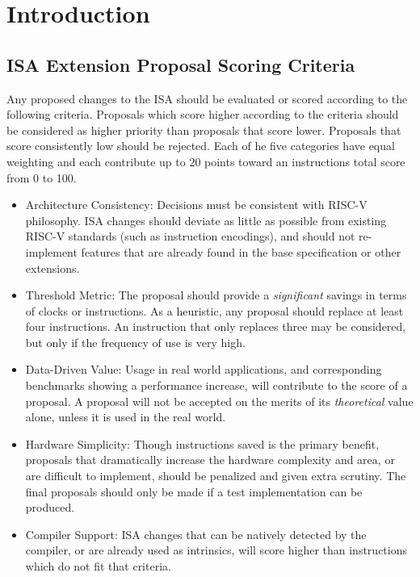\chapter{Introduction}

\section{ISA Extension Proposal Scoring Criteria}

Any proposed changes to the ISA should be evaluated or scored according
to the following criteria. Proposals which score higher according to the
criteria should be considered as higher priority than proposals that
score lower. Proposals that score consistently low should be rejected.
Each of he five categories have equal weighting and each contribute up
to 20 points toward an instructions total score from 0 to 100.

\begin{itemize}
\item
  Architecture Consistency: Decisions must be consistent with RISC-V
  philosophy. ISA changes should deviate as little as possible from
  existing RISC-V standards (such as instruction encodings), and should
  not re-implement features that are already found in the base
  specification or other extensions.
\item
  Threshold Metric: The proposal should provide a \emph{significant}
  savings in terms of clocks or instructions. As a heuristic, any
  proposal should replace at least four instructions. An instruction
  that only replaces three may be considered, but only if the frequency
  of use is very high.
\item
  Data-Driven Value: Usage in real world applications, and corresponding
  benchmarks showing a performance increase, will contribute to the
  score of a proposal. A proposal will not be accepted on the merits of
  its \emph{theoretical} value alone, unless it is used in the real
  world.
\item
  Hardware Simplicity: Though instructions saved is the primary benefit,
  proposals that dramatically increase the hardware complexity and area,
  or are difficult to implement, should be penalized and given extra
  scrutiny. The final proposals should only be made if a test
  implementation can be produced.
\item
  Compiler Support: ISA changes that can be natively detected by the
  compiler, or are already used as intrinsics, will score higher than
  instructions which do not fit that criteria.
\end{itemize}

